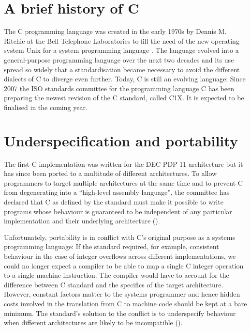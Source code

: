 \documentclass[a4paper,12pt]{scrbook}
\theoremstyle{plain}
\theoremstyle{definition}
\begin{document}
\section{A brief history of C}
The C programming language was created in the early 1970s by Dennis M. Ritchie
at the Bell Telephone Laboratories to fill the need of the new operating system
Unix for a system programming language \cite{developmentOfC}. The language
evolved into a general-purpose programming language over the next two decades
and its use spread so widely that a standardisation became necessary to avoid
the different dialects of C to diverge even further. Today, C is still an
evolving language: Since 2007 the ISO standards committee for the programming
language C has been preparing the newest revision of the C standard, called
C1X. It is expected to be finalised in the coming year.


\section{Underspecification and portability}
The first C implementation was written for the DEC PDP-11 architecture but it
has since been ported to a multitude of different architectures. To allow
programmers to target multiple architectures at the same time and to prevent C
from degenerating into a ``high-level assembly language'', the committee has
declared that C as defined by the standard must make it possible to write
programs whose behaviour is guaranteed to be independent of any particular
implementation and their underlying architecture ().

Unfortunately, portability is in conflict with C's original purpose as a systems
programming language: If the standard required, for example, consistent
behaviour in the case of integer overflows across different implementations, we
could no longer expect a compiler to be able to map a single C integer operation
to a single machine instruction. The compiler would have to account for the
difference between C standard and the specifics of the target
architecture. However, constant factors matter to the systems programmer and
hence hidden costs involved in the translation from C to machine code should be
kept at a bare minimum. The standard's solution to the conflict is to
underspecify behaviour when different architectures are likely to be
incompatible ().
\end{document}
